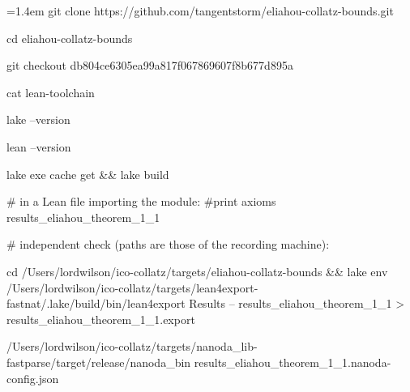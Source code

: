 \documentclass[11pt]{article}
\begin{document}
{\footnotesize\ttfamily\raggedright\hangindent=1.4em\noindent
\hspace*{0.00em}git clone https:/\allowbreak{}/\allowbreak{}github.\allowbreak{}com/\allowbreak{}tangentstorm/\allowbreak{}eliahou-collatz-bounds.\allowbreak{}git\par
\hspace*{0.00em}cd eliahou-collatz-bounds\par
\hspace*{0.00em}git checkout db804ce6305ea99a817f067869607f8b677d895a\par
\hspace*{0.00em}cat lean-toolchain\par
\hspace*{0.00em}lake --version\par
\hspace*{0.00em}lean --version\par
\hspace*{0.00em}lake exe cache get \&\& lake build\par
\hspace*{0.00em}\# in a Lean file importing the module:  \#print axioms results\_\allowbreak{}eliahou\_\allowbreak{}theorem\_\allowbreak{}1\_\allowbreak{}1\par
\hspace*{0.00em}\# independent check (paths are those of the recording machine):\par
\hspace*{0.00em}cd /\allowbreak{}Users/\allowbreak{}lordwilson/\allowbreak{}ico-collatz/\allowbreak{}targets/\allowbreak{}eliahou-collatz-bounds \&\& lake env /\allowbreak{}Users/\allowbreak{}lordwilson/\allowbreak{}ico-collatz/\allowbreak{}targets/\allowbreak{}lean4export-fastnat/\allowbreak{}.\allowbreak{}lake/\allowbreak{}build/\allowbreak{}bin/\allowbreak{}lean4export Results -- results\_\allowbreak{}eliahou\_\allowbreak{}theorem\_\allowbreak{}1\_\allowbreak{}1 > results\_\allowbreak{}eliahou\_\allowbreak{}theorem\_\allowbreak{}1\_\allowbreak{}1.\allowbreak{}export\par
\hspace*{0.00em}/\allowbreak{}Users/\allowbreak{}lordwilson/\allowbreak{}ico-collatz/\allowbreak{}targets/\allowbreak{}nanoda\_\allowbreak{}lib-fastparse/\allowbreak{}target/\allowbreak{}release/\allowbreak{}nanoda\_\allowbreak{}bin results\_\allowbreak{}eliahou\_\allowbreak{}theorem\_\allowbreak{}1\_\allowbreak{}1.\allowbreak{}nanoda-config.\allowbreak{}json\par
}
\end{document}
